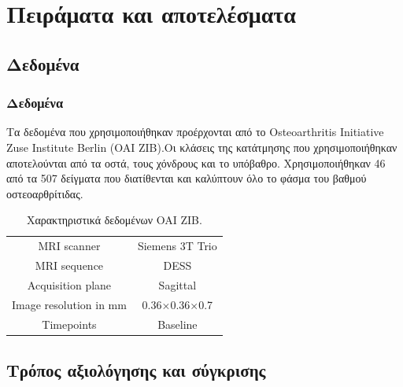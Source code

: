 \documentclass{beamer}
\begin{document}
\section{Πειράματα και αποτελέσματα}
\subsection{Δεδομένα}

\begin{frame}
\frametitle{Δεδομένα}

Τα δεδομένα που χρησιμοποιήθηκαν προέρχονται από το Osteoarthritis Initiative
Zuse Institute Berlin (OAI ZIB).Οι κλάσεις της κατάτμησης που χρησιμοποιήθηκαν
αποτελούνται από τα οστά, τους χόνδρους και το υπόβαθρο. Χρησιμοποιήθηκαν 46 από
τα 507 δείγματα που διατίθενται και καλύπτουν όλο το φάσμα του βαθμού
οστεοαρθρίτιδας.

\begin{table}[h!]
    \centering
    \begin{tabular}{|c|c|} 
        \hline
        MRI scanner            & Siemens 3T Trio \\ 
        MRI sequence           & DESS            \\
        Acquisition plane      & Sagittal        \\
        Image resolution in mm & 0.36×0.36×0.7   \\
        Timepoints             & Baseline        \\
        \hline
    \end{tabular}
    \caption{Χαρακτηριστικά δεδομένων OAI ZIB.}
    \label{dataset:1}
\end{table}


\end{frame}


\subsection{Τρόπος αξιολόγησης και σύγκρισης}
\end{document}
